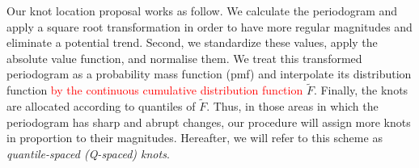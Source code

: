 \documentclass[twocolumn,final]{svjour3}
\newcommand{\bm}[1]{\mbox{\boldmath $#1$}}
\newcommand{\pmr}{ \color{red}}
\begin{document}
Our knot location proposal works as follow.  We calculate the periodogram and apply a square root transformation in order to have more regular magnitudes and eliminate a potential trend.  Second, we standardize these values, apply the absolute value function,{\pmr and normalise them}.  
We treat this transformed periodogram as a {\pmr probability mass} function (pmf) and interpolate its distribution function \textcolor{red}{ by the continuous cumulative distribution function} $\widetilde{F}$.
Finally, the knots are allocated according to quantiles of $\widetilde{F}$.
 Thus, in those areas in which the periodogram has sharp and abrupt changes, our procedure will assign more knots in proportion to their magnitudes. Hereafter, we will refer to this scheme as {\em  quantile-spaced (Q-spaced) knots}.%

\end{document}
